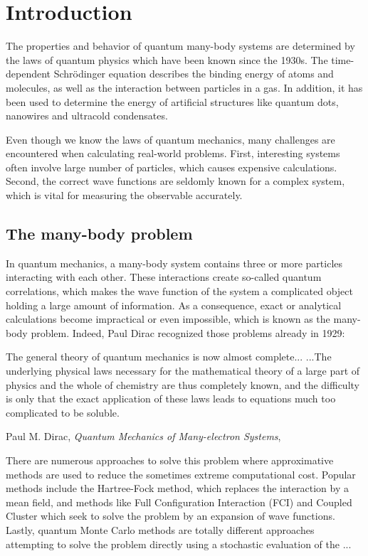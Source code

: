 \chapter{Introduction}
The properties and behavior of quantum many-body systems are determined by the laws of quantum physics which have been known since the 1930s.  The time-dependent Schrödinger equation describes the binding energy of atoms and molecules, as well as the interaction between particles in a gas. In addition, it has been used to determine the energy of artificial structures like quantum dots, nanowires and ultracold condensates. 

Even though we know the laws of quantum mechanics, many challenges are encountered when calculating real-world problems. First, interesting systems often involve large number of particles, which causes expensive calculations. Second, the correct wave functions are seldomly known for a complex system, which is vital for measuring the observable accurately. 

\section{The many-body problem}
In quantum mechanics, a many-body system contains three or more particles interacting with each other. These interactions create so-called quantum correlations, which makes the wave function of the system a complicated object holding a large amount of information. As a consequence, exact or analytical calculations become impractical or even impossible, which is known as the many-body problem. Indeed, Paul Dirac recognized those problems already in 1929:

\begin{shadequote}{
		The general theory of quantum mechanics is now almost complete... ...The underlying physical laws necessary for the mathematical theory of a large part of physics and the whole of chemistry are thus completely known, and the difficulty is only that the exact application of these laws leads to equations much too complicated to be soluble. \par Paul M. Dirac, \emph{Quantum Mechanics of Many-electron Systems}, \cite{dirac_paul_adrien_maurice_quantum_1929}}
\end{shadequote}

There are numerous approaches to solve this problem where approximative methods are used to reduce the sometimes extreme computational cost. Popular methods include the Hartree-Fock method, which replaces the interaction by a mean field, and methods like Full Configuration Interaction (FCI) and Coupled Cluster which seek to solve the problem by an expansion of wave functions. Lastly, quantum Monte Carlo methods are totally different approaches attempting to solve the problem directly using a stochastic evaluation of the ...

